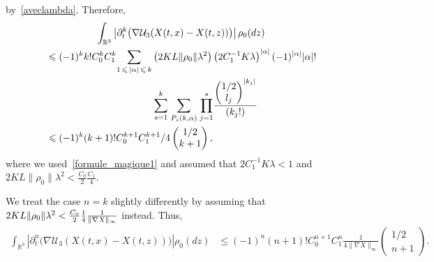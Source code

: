 \documentclass[10pt]{amsart}
\theoremstyle{definition}\newtheorem{defi}[theo]{Definition}\newtheorem{rema}[theo]{Remark}\newtheorem{exam}[theo]{Example}\newtheorem{exem}[theo]{Example}\newtheorem{nota}[theo]{Notation}
\newcommand{\R}{\mathbb{R}}
\newcommand{\clU}{\mathcal{U}}
\renewcommand{\leq}{\leqslant}
\begin{document}
by~\eqref{aveclambda}. Therefore,
\begin{multline*}
\int_{\R^3} \left|\partial_t^k \big(\nabla \clU_3(X(t,x)-X(t,z))\big) \right| \rho_0(dz)
\\
\begin{aligned}
&\leq (-1)^{k} k!C_0^kC_1^k \underset{1\,\leq\,|\alpha|\,\leq\,k}{\sum} \left(2KL \|\rho_0\| \lambda^2\right) \left(2 C_1^{-1}K\lambda\right)^{|\alpha|} (-1)^{|\alpha|}|\alpha|!\\
&\mkern200mu\underset{s=1}{\overset{k}{\sum}}\;\underset{P_s(k,\alpha)}{\sum}\;\underset{j=1}{\overset{s}{\prod}}\frac{
\begin{pmatrix}
1/2\\ l_j
\end{pmatrix}^{|k_j|} }{\left(k_j!\right)}\\
&\leq (-1)^{k} (k+1)!C_0^{k+1}C_1^{k+1}/4
\begin{pmatrix}
1/2\\ k+1
\end{pmatrix},
\end{aligned}
\end{multline*}
where we used~\eqref{formule_magique1} and assumed that $2 C_1^{-1}K\lambda<1 $ and $2KL \|\rho_0\| \lambda^2<\frac{C_0}{2}\frac{C_1}{4} $.

We treat the case $n=k$ slightly differently by assuming that $2KL \|\rho_0\| \lambda^2\linebreak<\frac{C_0}{2}\frac{1}{4}\frac{1}{\|\nabla X\|_\infty} $ instead. Thus,
\begin{align*}
\int_{\R^3} \left|\partial_t^n \big(\nabla \clU_3(X(t,x)-X(t,z))\big) \right| \rho_0(dz) &\leq (-1)^{n} (n+1)!C_0^{n+1}C_1^{n}\frac{1}{4 \|\nabla X\|_\infty}
\begin{pmatrix}
1/2\\ n+1
\end{pmatrix}.
\end{align*}
\end{document}
